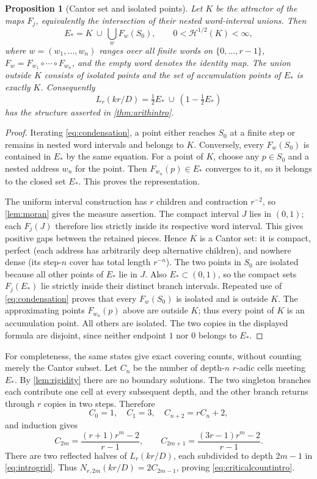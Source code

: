 \documentclass[11pt]{article}
\newtheorem{proposition}[theorem]{Proposition}
\theoremstyle{definition}
\theoremstyle{remark}
\newcommand{\HH}{\mathcal H}
\begin{document}
\begin{proposition}[Cantor set and isolated points]\label{prop:entire}
Let $K$ be the attractor of the maps $F_j$, equivalently the intersection
of their nested word-interval unions. Then
\begin{equation}\label{eq:entirerepresentation}
 E_*=K\ \cup\ \bigcup_{w}F_w(S_0),
 \qquad 0<\HH^{1/2}(K)<\infty,
\end{equation}
where $w=(w_1,\ldots,w_n)$ ranges over all finite words on
$\{0,\ldots,r-1\}$, $F_w=F_{w_1}\circ\cdots\circ F_{w_n}$,
and the empty word denotes the identity map. The union outside $K$ consists
of isolated points and the set of accumulation points of $E_*$ is exactly
$K$. Consequently
\[
 L_r(kr/D)=\tfrac12E_*\ \cup\ (1-\tfrac12E_*)
\]
has the structure asserted in \cref{thm:arithintro}.
\end{proposition}
\begin{proof}
Iterating \cref{eq:condensation}, a point either reaches $S_0$ at a finite
step or remains in nested word intervals and belongs to $K$.
Conversely, every $F_w(S_0)$ is contained in $E_*$ by the same equation.
For a point of $K$, choose any $p\in S_0$ and a nested address $w_n$ for
the point. Then $F_{w_n}(p)\in E_*$ converges to it, so it belongs to the
closed set $E_*$. This proves the representation.

The uniform interval construction has $r$ children and contraction
$r^{-2}$, so \cref{lem:moran} gives the measure assertion.
The compact interval $J$ lies in $(0,1)$; each $F_j(J)$ therefore lies
strictly inside its respective word interval. This gives positive gaps
between the retained pieces. Hence $K$ is a Cantor set: it is compact,
perfect (each address has arbitrarily deep alternative children), and
nowhere dense (its step-$n$ cover has total length $r^{-n}$).
The two points in $S_0$ are isolated because all other points of $E_*$
lie in $J$. Also $E_*\subset(0,1)$, so the compact sets $F_j(E_*)$
lie strictly inside their distinct branch intervals. Repeated use of
\cref{eq:condensation} proves that every $F_w(S_0)$ is isolated and is
outside $K$. The approximating points $F_{w_n}(p)$ above are outside $K$;
thus every point of $K$ is an accumulation point. All others are isolated.
The two copies in the displayed formula are disjoint, since neither
endpoint $1$ nor $0$ belongs to $E_*$.
\end{proof}

For completeness, the same states give exact covering counts, without
counting merely the Cantor subset. Let $C_n$ be the number of depth-$n$
$r$-adic cells meeting $E_*$. By \cref{lem:rigidity} there are no boundary
solutions. The two singleton branches each contribute one cell at every
subsequent depth, and the other branch returns through $r$ copies in two
steps. Therefore
\[
 C_0=1,\quad C_1=3,\quad C_{n+2}=rC_n+2,
\]
and induction gives
\begin{equation}\label{eq:exactCn}
 C_{2m}=\frac{(r+1)r^m-2}{r-1},\qquad
 C_{2m+1}=\frac{(3r-1)r^m-2}{r-1}.
\end{equation}
There are two reflected halves of $L_r(kr/D)$, each subdivided to depth
$2m-1$ in \cref{eq:introgrid}. Thus $N_{r,2m}(kr/D)=2C_{2m-1}$, proving
\cref{eq:criticalcountintro}.
\end{document}
